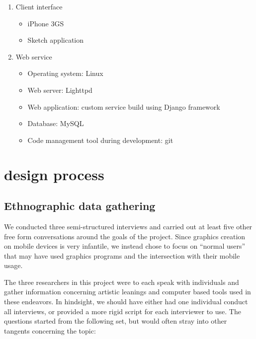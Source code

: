 \documentclass{chi2009}
\begin{document}
\begin{enumerate}
\item Client interface
        \begin{itemize}
        \item iPhone 3GS
        \item  Sketch application
        \end{itemize}

\item Web service
        \begin{itemize}
        \item Operating system: Linux
        \item Web server: Lighttpd
        \item Web application: custom service build using Django framework
        \item Database: MySQL
        \item Code management tool during development: git
        \end{itemize}
\end{enumerate}



\section{design process}

\subsection{Ethnographic data gathering}
We conducted three semi-structured interviews and carried out at least five
other free form conversations around the goals of the project.  Since graphics
creation on mobile devices is very infantile, we instead chose to focus on
``normal users'' that may have used graphics programs and the intersection with
their mobile usage.

The three researchers in this project were to each speak with individuals and
gather information concerning artistic leanings and computer based tools used
in these endeavors.  In hindsight, we should have either had one individual
conduct all interviews, or provided a more rigid script for each interviewer to
use.  The questions started from the following set, but would often stray into
other tangents concerning the topic:
\end{document}
